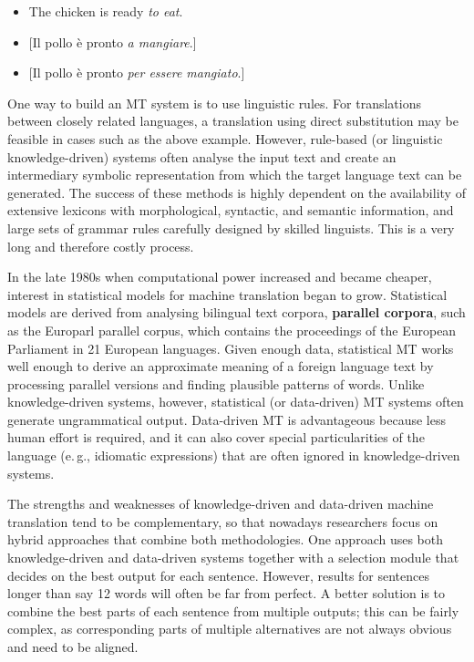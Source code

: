 \begin{multicols}{2}
\begin{itemize}
\item The chicken is ready \emph{to eat}.
\item {[}Il pollo  \`{e} pronto \emph{a mangiare}.{]}
\item {[}Il pollo  \`{e} pronto \emph{per essere mangiato}.{]}
\end{itemize}


One way to build an MT system is to use linguistic rules. For translations between closely related languages, a translation using direct substitution may be feasible in cases such as the above example. However, rule-based (or linguistic knowledge-driven) systems often analyse the input text and create an intermediary symbolic representation from which the target language text can be generated. The success of these methods is highly dependent on the availability of extensive lexicons with morphological, syntactic, and semantic information, and large sets of grammar rules carefully designed by skilled linguists. This is a very long and therefore costly process.
 
In the late 1980s when computational power increased and became cheaper, interest in statistical models for machine translation began to grow. Statistical models are derived from analysing bilingual text corpora, \textbf{parallel corpora}, such as the Europarl parallel corpus, which contains the proceedings of the European Parliament in 21 European languages. Given enough data, statistical MT works well enough to derive an approximate meaning of a foreign language text by processing parallel versions and finding plausible patterns of words. Unlike knowledge-driven systems, however, statistical (or data-driven) MT systems often generate ungrammatical output. Data-driven MT is advantageous because less human effort is required, and it can also cover special particularities of the language (e.\,g., idiomatic expressions) that are often ignored in knowledge-driven systems. 

The strengths and weaknesses of knowledge-driven and data-driven machine translation tend to be complementary, so that nowadays researchers focus on hybrid approaches that combine both methodologies. One approach uses both knowledge-driven and data-driven systems together with a selection module that decides on the best output for each sentence. However, results for sentences longer than say 12 words will often be far from perfect. A better solution is to combine the best parts of each sentence from multiple outputs; this can be fairly complex, as corresponding parts of multiple alternatives are not always obvious and need to be aligned. 


\end{multicols}
